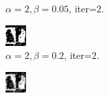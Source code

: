 \documentclass{article}
\begin{document}
\begin{figure}[t]
\begin{subfigure}[t]{0.27\textwidth}
  \vspace{-0.6cm}
  \caption{$\alpha=2, \beta=0.05$, iter=$2$.}
\end{subfigure}
\begin{subfigure}[t]{0.27\textwidth}
  \centering
  \includegraphics[width=\textwidth]{iii_alpha_2_beta_0.2_iterations_3.bmp}
  \vspace{-0.6cm}
  \caption{$\alpha=2, \beta=0.2$, iter=$2$.}
\end{subfigure}
\begin{subfigure}[t]{0.27\textwidth}
  \centering
  \includegraphics[width=\textwidth]{iii_alpha_2_beta_0.4_iterations_3.bmp}

\end{subfigure}
\end{figure}
\end{document}
